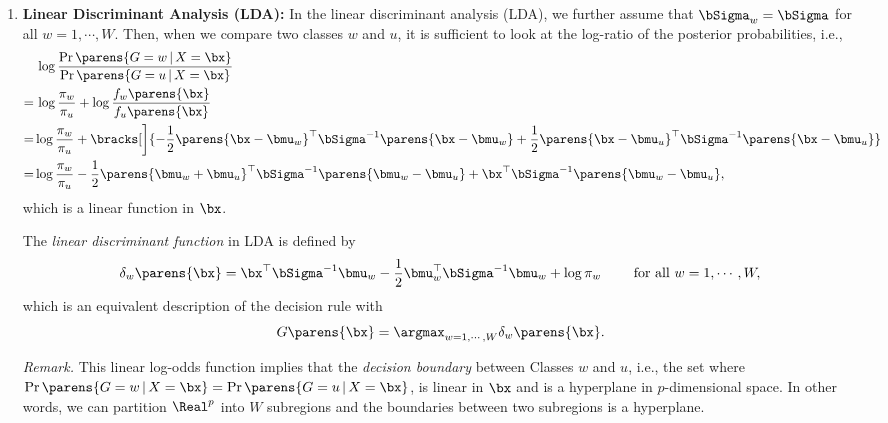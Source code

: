 \documentclass[12pt]{article}
\begin{document}
\begin{enumerate}[label=\textbf{\arabic*.}]
	\item \textbf{Linear Discriminant Analysis (LDA):} In the linear discriminant analysis (LDA), we further assume that $\bSigma_w = \bSigma$ for all $ w = 1, \cdots, W $. Then, when we compare two classes $w$ and $u$, it is sufficient to look at the log-ratio of the posterior probabilities, i.e., 
	\begin{align*}
		& \, \log \frac{\Pr \parens{G = w \,\vert\, X = \bx}}{\Pr \parens{G = u \,\vert\, X = \bx}} \\ 
		= & \, \log \frac{\pi_w}{\pi_u} + \log \frac{f_w \parens{\bx}}{f_u \parens{\bx}} \\
		= & \log \frac{\pi_w}{\pi_u} + \bracks[\bigg]{ - \frac{1}{2} \parens{\bx - \bmu_w}^\top \bSigma^{-1} \parens{\bx - \bmu_w} + \frac{1}{2} \parens{\bx - \bmu_u}^\top \bSigma^{-1} \parens{\bx - \bmu_u} } \\
		= & \log \frac{\pi_w}{\pi_u} - \frac{1}{2} \parens{\bmu_w + \bmu_u}^\top \bSigma^{-1} \parens{\bmu_w - \bmu_u} + \bx^\top \bSigma^{-1} \parens{\bmu_w - \bmu_u}, 
	\end{align*}
	which is a linear function in $\bx$. 
	
	The \textit{linear discriminant function} in LDA is defined by
	\begin{align}\label{eq-lda-decision-rule-max1}
		\delta_w \parens{\bx} = \bx^\top \bSigma^{-1} \bmu_w - \frac{1}{2} \bmu_w^\top \bSigma^{-1} \bmu_w + \log \pi_w \qquad \text{ for all } w = 1, \cdots, W, 
	\end{align}
	which is an equivalent description of the decision rule with 
	\begin{align}\label{eq-lda-decision-rule-max2}
		G \parens{\bx} = \argmax_{w = 1, \cdots, W} \delta_w \parens{\bx}. 
	\end{align}
	
	\textit{Remark.} This linear log-odds function implies that the \textit{decision boundary} between Classes $w$ and $u$, i.e., the set where $ \Pr \parens{G = w \,\vert\, X = \bx} = \Pr \parens{G = u \,\vert\, X = \bx} $, is linear in $\bx$ and is a hyperplane in $p$-dimensional space. In other words, we can partition $\Real^p$ into $W$ subregions and the boundaries between two subregions is a hyperplane. 
	

\end{enumerate}
\end{document}
